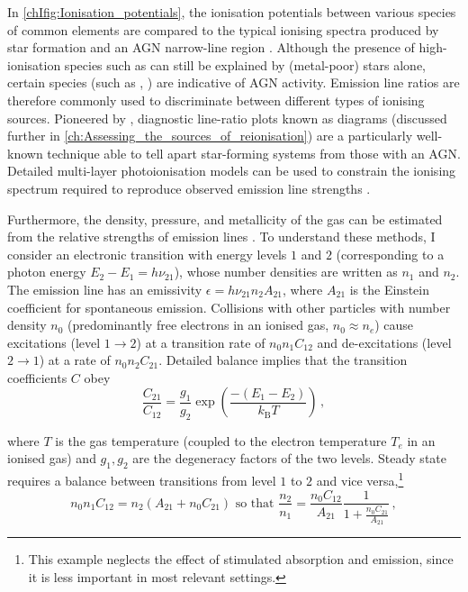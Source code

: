 In \cref{chIfig:Ionisation_potentials}, the ionisation potentials between various species of common elements are compared to the typical ionising spectra produced by star formation and an AGN narrow-line region \citep{2016MNRAS.456.3354F}. Although the presence of high-ionisation species such as  can still be explained by (metal-poor) stars alone, certain species (such as , ) are indicative of AGN activity. Emission line ratios are therefore commonly used to discriminate between different types of ionising sources. Pioneered by \citet*[;  hereafter]{1981PASP...93....5B}, diagnostic line-ratio plots known as  diagrams (discussed further in \cref{ch:Assessing_the_sources_of_reionisation}) are a particularly well-known technique able to tell apart star-forming systems from those with an AGN. Detailed multi-layer photoionisation models can be used to constrain the ionising spectrum required to reproduce observed emission line strengths \citep[e.g.][]{2021ApJ...922..170B}.

Furthermore, the density, pressure, and metallicity of the gas can be estimated from the relative strengths of emission lines \citep{2017PASP..129h2001P, 2019ARA&A..57..511K}. To understand these methods, I consider an electronic transition with energy levels $1$ and $2$ (corresponding to a photon energy $E_2 - E_1 = h \nu_{21}$), whose number densities are written as $n_1$ and $n_2$. The emission line has an emissivity $\epsilon = h \nu_{21} n_2 A_{21}$, where $A_{21}$ is the Einstein coefficient for spontaneous emission. Collisions with other particles with number density $n_0$ (predominantly free electrons in an ionised gas, $n_0 \approx n_e$) cause excitations (level $1 \rightarrow 2$) at a transition rate of $n_0 n_1 C_{12}$ and de-excitations (level $2 \rightarrow 1$) at a rate of $n_0 n_2 C_{21}$. Detailed balance implies that the transition coefficients $C$ obey
\begin{equation}
    \label{chIeq:Collisional_excitation_rates}
    \frac{C_{21}}{C_{12}} = \frac{g_1}{g_2} \exp \left( \frac{- \left( E_1 - E_2 \right)}{k_\text{B} T} \right) \, ,
\end{equation}

\noindent where $T$ is the gas temperature (coupled to the electron temperature $T_e$ in an ionised gas) and $g_1, g_2$ are the degeneracy factors of the two levels. Steady state requires a balance between transitions from level $1$ to $2$ and vice versa,\footnote{This example neglects the effect of stimulated absorption and emission, since it is less important in most relevant settings.}
\begin{equation}
    \label{chIeq:Collisional_excitation_equilibrium}
    n_0 n_1 C_{12} = n_2 \left( A_{21} + n_0 C_{21} \right) \text{ so that } \frac{n_2}{n_1} = \frac{n_0 C_{12}}{A_{21}} \frac{1}{1 + \frac{n_0 C_{21}}{A_{21}}} \, ,
\end{equation}

